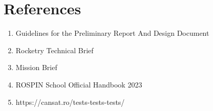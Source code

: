 \section{References}

\begin{enumerate}
    \item Guidelines for the Preliminary Report And Design Document
    \item Rocketry Technical Brief
    \item Mission Brief
    \item ROSPIN School Official Handbook 2023
    \item https://cansat.ro/tests-tests-tests/
\end{enumerate}